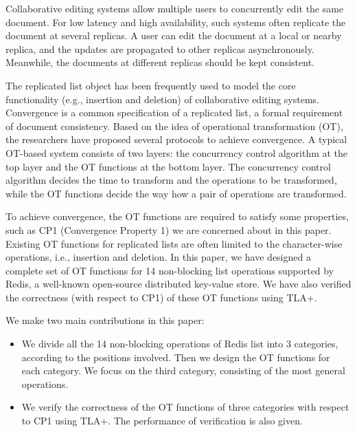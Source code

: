 \begin{englishabstract}
Collaborative editing systems allow multiple users to concurrently edit the same document.
For low latency and high availability, such systems often replicate the document at several replicas.
A user can edit the document at a local or nearby replica, 
and the updates are propagated to other replicas asynchronously.
Meanwhile, the documents at different replicas should be kept consistent. 

The replicated list object has been frequently used to model the core functionality 
(e.g., insertion and deletion) of collaborative editing systems.
Convergence is a common specification of a replicated list, a formal requirement of document consistency.
Based on the idea of operational transformation (OT), 
the researchers have proposed several protocols to achieve convergence.
A typical OT-based system consists of two layers: 
the concurrency control algorithm at the top layer and the OT functions at the bottom layer.
The concurrency control algorithm decides the time to transform and the operations to be transformed,
while the OT functions decide the way how a pair of operations are transformed.

To achieve convergence, the OT functions are required to satisfy some properties, 
such as CP1 (Convergence Property 1) we are concerned about in this paper.
Existing OT functions for replicated lists are often limited to the character-wise operations, 
i.e., insertion and deletion.
In this paper, we have designed a complete set of OT functions for 14 non-blocking list operations supported by Redis, 
a well-known open-source distributed key-value store.
We have also verified the correctness (with respect to CP1) of these OT functions using TLA+.

We make two main contributions in this paper:
\begin{itemize}
  \item We divide all the 14 non-blocking operations of Redis list into 3 categories, 
    according to the positions involved. 
    Then we design the OT functions for each category.
    We focus on the third category, consisting of the most general operations.
  \item 
    We verify the correctness of the OT functions of three categories with respect to CP1
    using TLA+.
    The performance of verification is also given.
\end{itemize}

\end{englishabstract}